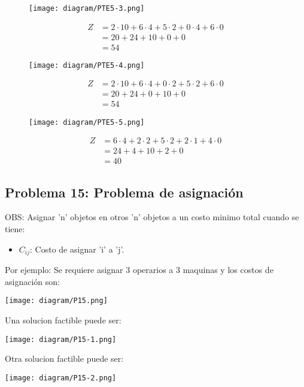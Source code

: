 \documentclass{templateNote}
\begin{document}
\begin{figure}[H]
    \centering
    \texttt{[image: diagram/PTE5-3.png]}
\end{figure}
\begin{align*}
    Z &= 2 \cdot 10 + 6 \cdot 4 + 5 \cdot 2 + 0 \cdot 4 + 6 \cdot 0 \\
    &= 20 + 24 + 10 + 0 + 0 \\
    &=  54
\end{align*}

\begin{figure}[H]
    \centering
    \texttt{[image: diagram/PTE5-4.png]}
\end{figure}
\begin{align*}
    Z &= 2 \cdot 10 + 6 \cdot 4 + 0 \cdot 2 + 5 \cdot 2 + 6 \cdot 0 \\
    &= 20 + 24 + 0 + 10 + 0 \\
    &=  54
\end{align*}
\begin{figure}[H]
    \centering
    \texttt{[image: diagram/PTE5-5.png]}
\end{figure}
\begin{align*}
    Z &= 6 \cdot 4 + 2 \cdot 2 + 5 \cdot 2 + 2 \cdot 1 + 4 \cdot 0 \\
    &= 24 + 4 + 10 + 2 + 0 \\
    &=  40
\end{align*}

\subsection*{Problema 15: Problema de asignación}
OBS: Asignar 'n' objetos en otros 'n' objetos a un costo minimo total cuando se tiene:
\begin{itemize}
    \item $C_{ij}$: Costo de asignar 'i' a 'j'.
\end{itemize}
Por ejemplo: Se requiere asignar 3 operarios a 3 maquinas y los costos de asignación son:
\begin{center}
    \texttt{[image: diagram/P15.png]}
\end{center}

Una solucion factible puede ser:
\begin{center}
    \texttt{[image: diagram/P15-1.png]}
\end{center}

Otra solucion factible puede ser:
\begin{center}
    \texttt{[image: diagram/P15-2.png]}
\end{center}
\end{document}
